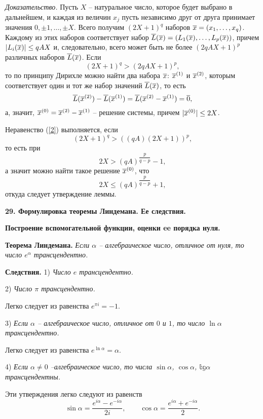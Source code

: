 
\emph{Доказательство.} Пусть $X$  -- натуральное число, которое
будет выбрано в дальнейшем, и каждая из величин $x_j$ пусть
независимо друг от друга принимает значения $0, \pm 1, \dots, \pm
X.$ Всего получим $(2X+1)^q$ наборов $\overline x=(x_1, \dots, x_q)$.
Каждому из этих наборов соответствует набор $\overline L(\overline x) =
(L_1(\overline x ), \dots, L_p ( \overline x ))$, причем $|L_i(\overline x )| \leq
qAX$  и, следовательно, всего может быть не более $(2qAX+1)^p$
различных наборов   $\overline L ( \overline x )$.   Если
\begin{equation}\label{2}
(2X+1)^q > (2qAX+1)^p,
 \end{equation}
  то по принципу
Дирихле можно найти два  набора  $\overline x$: $\overline x^{(1)}$ и $\overline
x^{(2)}$, которым соответствует один и тот же набор значений $\overline
L (\overline x)$, то есть
$$
\overline L (\overline x^{(2)}) - \overline L (\overline x^{(1)}) = \overline L (\overline x^{(2)}-
\overline x^{(1)}) = \overline 0,
$$
а, значит, $\overline x^{(0)} = \overline x^{(2)}- \overline x^{(1)}  $ -- решение
системы, причем $|\overline x^{(0)}| \leq 2X$.

Неравенство (\ref {2})   выполняется, если
$$
(2X+1)^q > ((qA)(2X+1))^p,
$$
то есть при
$$
2X > (qA)^{\dfrac p{q-p}} -1,
$$
а значит можно найти такое решение $\overline x^{(0)}$, что
$$
2X \le (qA)^{\dfrac p{q-p}} +1,
$$
откуда следует утверждение леммы.


\vskip 5mm \centerline{\bf {29. Формулировка теоремы Линдемана. Ее
следствия.}  } \centerline{\bf {Построение вспомогательной
функции, оценки ee порядка нуля.}} \vskip 5mm

 {\bf Теорема Линдемана.}  {\it Если  $\alpha$ --   алгебраическое
число, отличное от нуля, то число $e^{\alpha}$ трансцендентно.}

{\bf Следствия.} 1)  {\it  Число $e$ трансцендентно.}


 2)  {\it Число $\pi$ трансцендентно.}

 Легко следует из равенства $e^{\pi i}=-1$.

3)  {\it Если $\alpha$ -- алгебраическое число, отличное от $0$ и
$1$, то число $\ln {\alpha}$ трансцендентно.}

Легко следует из равенства $e^{\ln \alpha}= \alpha$.

4) {\it Если $\alpha \ne 0$ --алгебраическое число, то числа $\sin
\alpha$, $\cos \alpha$, $\mathbb{tg} \alpha$ трансцендентны.}

Эти утверждения легко следуют из равенств
$$
\sin \alpha = \frac {e^{i \alpha}- e^{-i \alpha}}{2i}, \qquad \cos
\alpha = \frac {e^{i \alpha}+ e^{-i \alpha}}{2}.
$$


